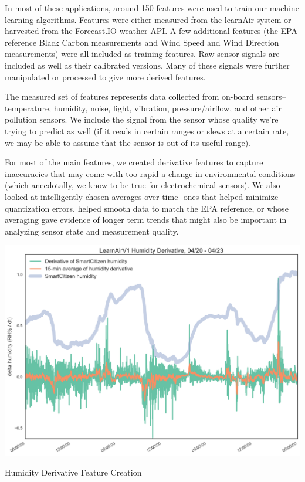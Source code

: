 In most of these applications, around 150 features were used to train our machine learning algorithms.  Features were either measured from the learnAir system or harvested from the Forecast.IO weather API.  A few additional features (the EPA reference Black Carbon measurements and Wind Speed and Wind Direction measurements) were all included as training features.  Raw sensor signals are included as well as their calibrated versions.  Many of these signals were further manipulated or processed to give more derived features.  

The measured set of features represents data collected from on-board sensors-- temperature, humidity, noise, light, vibration, pressure/airflow, and other air pollution sensors.  We include the signal from the sensor whose quality we're trying to predict as well (if it reads in certain ranges or slews at a certain rate, we may be able to assume that the sensor is out of its useful range).  

For most of the main features, we created derivative features to capture inaccuracies that may come with too rapid a change in environmental conditions (which anecdotally, we know to be true for electrochemical sensors).  We also looked at intelligently chosen averages over time- ones that helped minimize quantization errors, helped smooth data to match the EPA reference, or whose averaging gave evidence of longer term trends that might also be important in analyzing sensor state and measurement quality.

\begin{marginfigure}
 	\includegraphics[width=\textwidth]{figs/humidity_derivative}               
 	 \caption{Humidity Derivative Feature Creation}
  	\label{fig:humidity_derivative}
\end{marginfigure}

